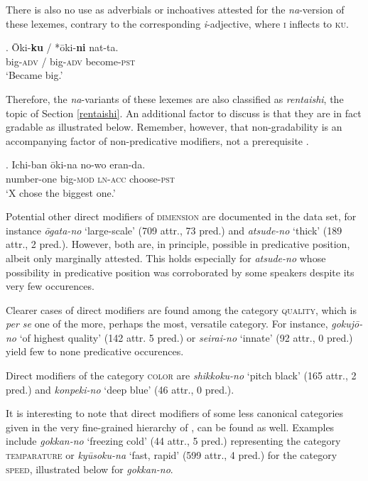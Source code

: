 There is also no use as adverbials or inchoatives attested for the \textit{na}-version of these lexemes, contrary to the corresponding \textit{i}-adjective, where \textsc{i} inflects to \textsc{ku}. 

\exg. Ōki-\textbf{ku} / *ōki-\textbf{ni} nat-ta.\\
big-\textsc{adv} / big-\textsc{adv} become-\textsc{pst}\\
`Became big.’

Therefore, the \textit{na}-variants of these lexemes are also classified as \textit{rentaishi}, the topic of Section \ref{rentaishi}. An additional factor to discuss is that they are in fact gradable as illustrated below. Remember, however, that non-gradability is an accompanying factor of non-predicative modifiers, not a prerequisite \citep[47]{cinque:2010:adj}. 

\exg. Ichi-ban ōki-na no-wo eran-da.\\
number-one big-\textsc{mod} \textsc{ln}-\textsc{acc} choose-\textsc{pst}\\
`X chose the biggest one.’ \hfill \citep[1: 28]{sekine:1937:fukutaishi}

Potential other direct modifiers of \textsc{dimension} are documented in the data set, for instance \textit{ōgata-no} `large-scale' (709 attr., 73 pred.) and \textit{atsude-no} `thick’ (189 attr., 2 pred.). However, both are, in principle, possible in predicative position, albeit only marginally attested. This holds especially for \textit{atsude-no} whose possibility in predicative position was corroborated by some speakers despite its very few occurences.

Clearer cases of direct modifiers are found among the category \textsc{quality}, which is \textit{per se} one of the more, perhaps the most, versatile category. For instance, \textit{gokujō-no} `of highest quality' (142 attr. 5 pred.) or \textit{seirai-no} `innate’ (92 attr., 0 pred.) yield few to none predicative occurences.

Direct modifiers of the category \textsc{color} are \textit{shikkoku-no} `pitch black' (165 attr., 2 pred.) and \textit{konpeki-no} `deep blue’ (46 attr., 0 pred.).

\largerpage
It is interesting to note that direct modifiers of some less canonical categories given in the very fine-grained hierarchy of \citet[106, 114]{scott:2002:stacked}, can be found as well. Examples include \textit{gokkan-no} `freezing cold’ (44 attr., 5 pred.) representing the category \textsc{temparature} or \textit{kyūsoku-na} `fast, rapid’ (599 attr., 4 pred.) for the category \textsc{speed}, illustrated below for \textit{gokkan-no}.

